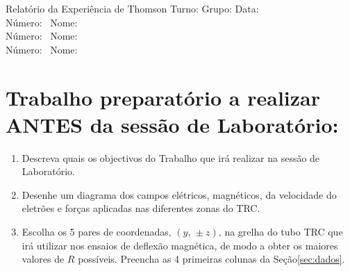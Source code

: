 \documentclass[a4paper,12pt]{article}  %
\author{Prof. Bernardo B. Carvalho}
\date{ Outubro 2015}
\newcommand{\HRule}{\rule{\linewidth}{0.5mm}}
\begin{document}
 



{  \sf  Relatório da Experiência de Thomson} %
Turno:\underline{\makebox[1.5cm][l]{~}} Grupo:\underline{\makebox[1.5cm][l]{~}} Data:\underline{\makebox[1.5cm][l]{~}}\\
\noindent Número:~\underline{\makebox[2cm][r]{~}} Nome:~\underline{\makebox[10cm][r]{~}} \\
\noindent Número:~\underline{\makebox[2cm][r]{~}} Nome:~\underline{\makebox[10cm][r]{~}} \\
\noindent Número:~\underline{\makebox[2cm][r]{~}} Nome:~\underline{\makebox[10cm][r]{~}} 


\section{\sf Trabalho preparatório a realizar ANTES da sessão de Laboratório:}
\begin{enumerate}
\item Descreva quais os objectivos do Trabalho que irá realizar na sessão de Laboratório. 
\item Desenhe um diagrama dos campos elétricos, magnéticos, da velocidade do eletrões e forças aplicadas nas diferentes zonas do TRC.
\item Escolha os 5 pares de coordenadas, $(y,\, \pm z)$, na grelha do tubo TRC que irá utilizar nos ensaios de deflexão magnética, de modo a obter os maiores valores  de $R$ possíveis. Preencha as 4 primeiras colunas da Seção\ref{sec:dados}.
\end{enumerate}
\end{document}
